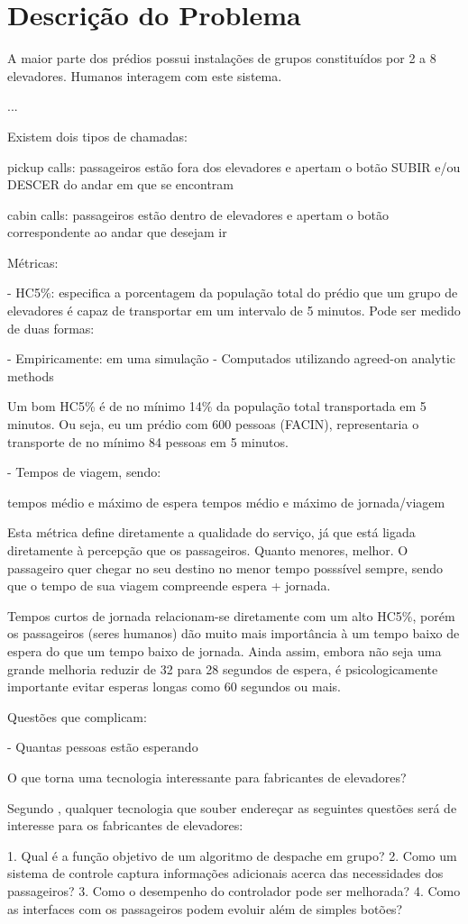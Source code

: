 \chapter{\label{chap:problem}Descrição do Problema}

A maior parte dos prédios possui instalações de grupos constituídos por 2 a 8 elevadores. Humanos interagem com este sistema.

...

Existem dois tipos de chamadas:

\begin{description}
\item pickup calls: passageiros estão fora dos elevadores e apertam o botão SUBIR e/ou DESCER do andar em que se encontram
\item cabin calls: passageiros estão dentro de elevadores e apertam o botão correspondente ao andar que desejam ir
\end{description}

Métricas:

 - HC5\%: especifica a porcentagem da população total do prédio que um grupo de elevadores é capaz de transportar em um intervalo de 5 minutos. Pode ser medido de duas formas:

    - Empiricamente: em uma simulação
    - Computados utilizando agreed-on analytic methods

  Um bom HC5\% é de no mínimo 14\% da população total transportada em 5 minutos. Ou seja, eu um prédio com 600 pessoas (FACIN), representaria o transporte de no mínimo 84 pessoas em 5 minutos.

  - Tempos de viagem, sendo:

    tempos médio e máximo de espera
    tempos médio e máximo de jornada/viagem

    Esta métrica define diretamente a qualidade do serviço, já que está ligada diretamente à percepção que os passageiros. Quanto menores, melhor.
    O passageiro quer chegar no seu destino no menor tempo posssível sempre, sendo que o tempo de sua viagem compreende espera + jornada.

    Tempos curtos de jornada relacionam-se diretamente com um alto HC5\%, porém os passageiros (seres humanos) dão muito mais importância à um tempo baixo de espera do que um tempo baixo de jornada.
    Ainda assim, embora não seja uma grande melhoria reduzir de 32 para 28 segundos de espera, é psicologicamente importante evitar esperas longas como 60 segundos ou mais.

Questões que complicam:

- Quantas pessoas estão esperando

O que torna uma tecnologia interessante para fabricantes de elevadores?

Segundo \cite{KOEHLEROTTIGER02}, qualquer tecnologia que souber endereçar as seguintes questões será de interesse para os fabricantes de elevadores:

1. Qual é a função objetivo de um algoritmo de despache em grupo?
2. Como um sistema de controle captura informações adicionais acerca das necessidades dos passageiros?
3. Como o desempenho do controlador pode ser melhorada?
4. Como as interfaces com os passageiros podem evoluir além de simples botões?


\cite{KOEHLEROTTIGER02}